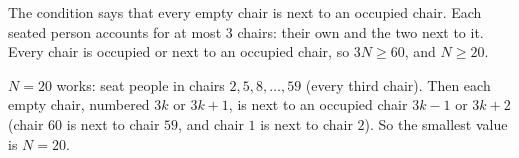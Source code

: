 The condition says that every empty chair is next to an occupied chair. Each seated person accounts for at most $3$ chairs: their own and the two next to it. Every chair is occupied or next to an occupied chair, so $3N\ge60$, and $N\ge20$.

$N=20$ works: seat people in chairs $2,5,8,\ldots,59$ (every third chair). Then each empty chair, numbered $3k$ or $3k+1$, is next to an occupied chair $3k-1$ or $3k+2$ (chair $60$ is next to chair $59$, and chair $1$ is next to chair $2$). So the smallest value is $N=\boxed{20}$.
